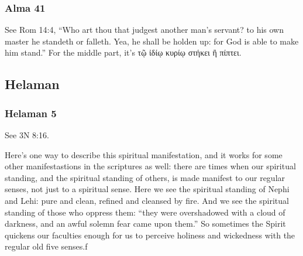 	\subsubsection{Alma 41} %
		
		\begin{compactdesc}
		
		\item[7$\vert$]
		\begin{compactdesc}
		\item[stand or fall] See Rom 14:4, ``Who art thou that judgest another man's servant? to his own master he standeth or falleth. Yea, he shall be holden up: for God is able to make him stand.'' For the middle part, it's \textgreek{τῷ ἰδίῳ κυρίῳ στήκει ἢ πίπτει}.
		\end{compactdesc}
		
		\end{compactdesc}

\subsection{Helaman} %

	\subsubsection{Helaman 5} %
	
		\begin{compactdesc}
		
		\item[12$\vert$]
		\begin{compactdesc}
		\item[shafts in the whirlwind] See 3N 8:16.
		\end{compactdesc}
		
		\item[21--49$\vert$]
		\begin{compactdesc}
		\item[The story] Here's one way to describe this spiritual manifestation, and it works for some other manifestastions in the scriptures as well: there are times when our spiritual standing, and the spiritual standing of others, is made manifest to our regular senses, not just to a spiritual sense. Here we see the spiritual standing of Nephi and Lehi: pure and clean, refined and cleansed by fire. And we see the spiritual standing of those who oppress them: ``they were overshadowed with a cloud of darkness, and an awful solemn fear came upon them.'' So sometimes the Spirit quickens our faculties enough for us to perceive holiness and wickedness with the regular old five senses.f
		\end{compactdesc}
		
		\end{compactdesc}
		
